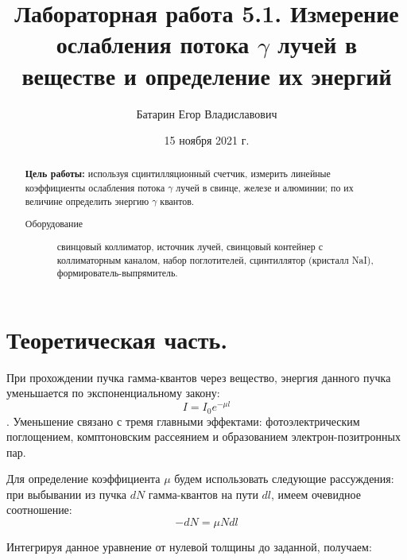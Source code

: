 \documentclass[%
reprint,
amsmath,amssymb,
aps,
]{revtex4-2}
\begin{document}
	
	
	
	\title{Лабораторная работа 5.1. Измерение ослабления потока $\gamma$ лучей в веществе и определение их энергий}%
	
	
	
	\author{Батарин Егор Владиславович}
	
	
	\date{15 ноября 2021 г.}%
	
	
	\begin{abstract}
		\textbf{Цель работы:} используя сцинтилляционный счетчик, измерить линейные коэффициенты ослабления потока $\gamma$ лучей в свинце, железе и алюминии; по их величине определить энергию $\gamma$ квантов.
		\begin{description}
			\item[Оборудование]
			свинцовый коллиматор, источник лучей, свинцовый контейнер с коллиматорным каналом, набор поглотителей, сцинтиллятор (кристалл NaI), формирователь-выпрямитель.
		\end{description}
	\end{abstract}
	
	\maketitle
	
	
	\section{Теоретическая часть.}
	
	При прохождении пучка гамма-квантов через вещество, энергия данного пучка уменьшается по экспоненциальному закону:
	\[I = I_{0} e^{-\mu l}\].
	Уменьшение связано с тремя главными эффектами: фотоэлектрическим поглощением, комптоновским рассеянием и образованием электрон-позитронных пар.
	
	Для определение коэффициента $\mu$ будем использовать следующие рассуждения: при выбывании из пучка $dN$ гамма-квантов на пути $dl$, имеем очевидное соотношение:
	\[-dN = \mu N dl\]
	
	Интегрируя данное уравнение от нулевой толщины до заданной, получаем:
	
\end{document}

